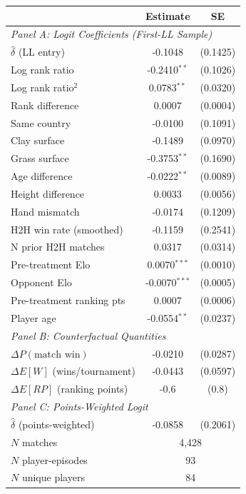 \begin{tabular}{lcc}
\toprule
 & Estimate & SE \\
\midrule
\multicolumn{3}{l}{\textit{Panel A: Logit Coefficients (First-LL Sample)}} \\[3pt]
$\hat{\delta}$ (LL entry) & -0.1048 & (0.1425) \\
Log rank ratio & -0.2410$^{**}$ & (0.1026) \\
Log rank ratio$^2$ & 0.0783$^{**}$ & (0.0320) \\
Rank difference & 0.0007 & (0.0004) \\
Same country & -0.0100 & (0.1091) \\
Clay surface & -0.1489 & (0.0970) \\
Grass surface & -0.3753$^{**}$ & (0.1690) \\
Age difference & -0.0222$^{**}$ & (0.0089) \\
Height difference & 0.0033 & (0.0056) \\
Hand mismatch & -0.0174 & (0.1209) \\
H2H win rate (smoothed) & -0.1159 & (0.2541) \\
N prior H2H matches & 0.0317 & (0.0314) \\
Pre-treatment Elo & 0.0070$^{***}$ & (0.0010) \\
Opponent Elo & -0.0070$^{***}$ & (0.0005) \\
Pre-treatment ranking pts & 0.0007 & (0.0006) \\
Player age & -0.0554$^{**}$ & (0.0237) \\
\midrule
\multicolumn{3}{l}{\textit{Panel B: Counterfactual Quantities}} \\[3pt]
$\Delta P(\text{match win})$ & -0.0210 & (0.0287) \\
$\Delta E[W]$ (wins/tournament) & -0.0443 & (0.0597) \\
$\Delta E[RP]$ (ranking points) & -0.6 & (0.8) \\
\midrule
\multicolumn{3}{l}{\textit{Panel C: Points-Weighted Logit}} \\[3pt]
$\hat{\delta}$ (points-weighted) & -0.0858 & (0.2061) \\
\midrule
$N$ matches & \multicolumn{2}{c}{4,428} \\
$N$ player-episodes & \multicolumn{2}{c}{93} \\
$N$ unique players & \multicolumn{2}{c}{84} \\
\bottomrule
\end{tabular}
